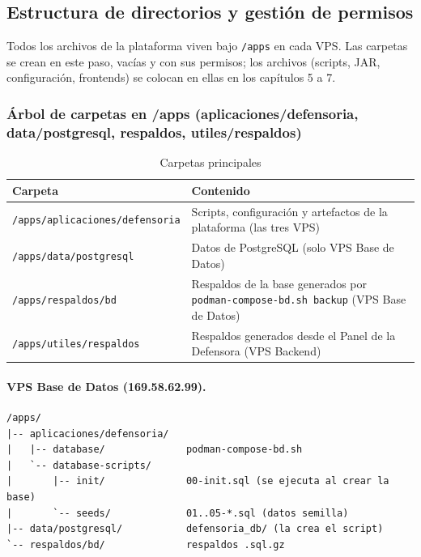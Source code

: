 \subsection{Estructura de directorios y gestión de permisos}\label{sec:2_3_directorios_permisos}
Todos los archivos de la plataforma viven bajo \texttt{/apps} en cada VPS. Las carpetas se crean en este paso, vacías y con sus permisos; los archivos (scripts, JAR, configuración, frontends) se colocan en ellas en los capítulos 5 a 7.

\subsubsection{Árbol de carpetas en /apps (aplicaciones/defensoria, data/postgresql, respaldos, utiles/respaldos)}
\begin{table}[H]
\centering
\caption{Carpetas principales}
\small
\begin{tabular}{p{6.2cm}p{8.3cm}}
\toprule
\textbf{Carpeta} & \textbf{Contenido} \\
\midrule
\nolinkurl{/apps/aplicaciones/defensoria} & Scripts, configuración y artefactos de la plataforma (las tres VPS) \\
\nolinkurl{/apps/data/postgresql} & Datos de PostgreSQL (solo VPS Base de Datos) \\
\nolinkurl{/apps/respaldos/bd} & Respaldos de la base generados por \texttt{podman-compose-bd.sh backup} (VPS Base de Datos) \\
\nolinkurl{/apps/utiles/respaldos} & Respaldos generados desde el Panel de la Defensora (VPS Backend) \\
\bottomrule
\end{tabular}
\end{table}

\paragraph{VPS Base de Datos (169.58.62.99).}
\begin{lstlisting}
/apps/
|-- aplicaciones/defensoria/
|   |-- database/              podman-compose-bd.sh
|   `-- database-scripts/
|       |-- init/              00-init.sql (se ejecuta al crear la base)
|       `-- seeds/             01..05-*.sql (datos semilla)
|-- data/postgresql/           defensoria_db/ (la crea el script)
`-- respaldos/bd/              respaldos .sql.gz
\end{lstlisting}

